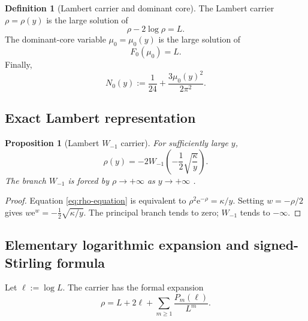 \documentclass[11pt,a4paper]{article}
\numberwithin{equation}{section}
\newtheorem{proposition}[theorem]{Proposition}
\theoremstyle{definition}
\newtheorem{definition}[theorem]{Definition}
\theoremstyle{remark}
\newcommand{\e}{\mathrm e}
\begin{document}
\begin{definition}[Lambert carrier and dominant core]\label{def:carrier-core}
The Lambert carrier $\rho=\rho(y)$ is the large solution of
\begin{equation}\label{eq:rho-equation}
 \rho-2\log\rho=L.
\end{equation}
The dominant-core variable $\mu_0=\mu_0(y)$ is the large solution of
\begin{equation}\label{eq:mu0-equation}
 F_0(\mu_0)=L.
\end{equation}
Finally,
\begin{equation}\label{eq:N0-def}
 N_0(y):=\frac1{24}+\frac{3\mu_0(y)^2}{2\pi^2}.
\end{equation}
\end{definition}

\subsection{Exact Lambert representation}

\begin{proposition}[Lambert $W_{-1}$ carrier]\label{prop:rho-W}
For sufficiently large $y$,
\begin{equation}\label{eq:rho-W}
 \boxed{
 \rho(y)=-2W_{-1}\!\left(-\frac12
 \sqrt{\frac{\kappa}{y}}\right).}
\end{equation}
The branch $W_{-1}$ is forced by $\rho\to+\infty$ as $y\to+\infty$
\cite{CorlessEtAl1996,JeffreyEtAl1995}.
\end{proposition}

\begin{proof}
Equation \eqref{eq:rho-equation} is equivalent to
$\rho^2\e^{-\rho}=\kappa/y$.  Setting $w=-\rho/2$ gives
$w\e^w=-\tfrac12\sqrt{\kappa/y}$.  The principal branch tends to zero;
$W_{-1}$ tends to $-\infty$.
\end{proof}

\subsection{Elementary logarithmic expansion and signed-Stirling formula}

Let $\ell:=\log L$.  The carrier has the formal expansion
\begin{equation}\label{eq:rho-log-expansion}
 \rho=L+2\ell+\sum_{m\geq1}\frac{P_m(\ell)}{L^m}.
\end{equation}
\end{document}

